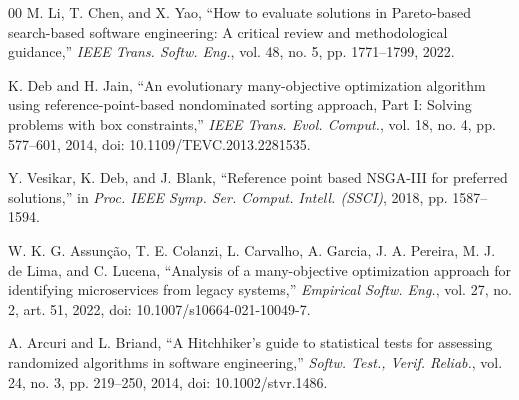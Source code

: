 \documentclass[conference]{IEEEtran}
\begin{document}
\begin{thebibliography}{00}
 M. Li, T. Chen, and X. Yao, ``How to evaluate solutions in Pareto-based search-based software engineering: A critical review and methodological guidance,'' \textit{IEEE Trans. Softw. Eng.}, vol. 48, no. 5, pp. 1771--1799, 2022.

 K. Deb and H. Jain, ``An evolutionary many-objective optimization algorithm using reference-point-based nondominated sorting approach, Part I: Solving problems with box constraints,'' \textit{IEEE Trans. Evol. Comput.}, vol. 18, no. 4, pp. 577--601, 2014, doi: 10.1109/TEVC.2013.2281535.

 Y. Vesikar, K. Deb, and J. Blank, ``Reference point based NSGA-III for preferred solutions,'' in \textit{Proc. IEEE Symp. Ser. Comput. Intell. (SSCI)}, 2018, pp. 1587--1594.

 W. K. G. Assunção, T. E. Colanzi, L. Carvalho, A. Garcia, J. A. Pereira, M. J. de Lima, and C. Lucena, ``Analysis of a many-objective optimization approach for identifying microservices from legacy systems,'' \textit{Empirical Softw. Eng.}, vol. 27, no. 2, art. 51, 2022, doi: 10.1007/s10664-021-10049-7.

 A. Arcuri and L. Briand, ``A Hitchhiker's guide to statistical tests for assessing randomized algorithms in software engineering,'' \textit{Softw. Test., Verif. Reliab.}, vol. 24, no. 3, pp. 219--250, 2014, doi: 10.1002/stvr.1486.

\end{thebibliography}
\end{document}
